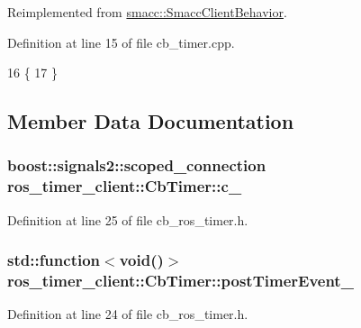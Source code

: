 Reimplemented from \hyperlink{classsmacc_1_1SmaccClientBehavior_ac0cd72d42bd00425362a97c9803ecce5}{smacc\+::\+Smacc\+Client\+Behavior}.



Definition at line 15 of file cb\+\_\+timer.\+cpp.


\begin{DoxyCode}
16 \{
17 \}
\end{DoxyCode}


\subsection{Member Data Documentation}
\subsubsection[{\texorpdfstring{c\+\_\+}{c_}}]{\setlength{\rightskip}{0pt plus 5cm}boost\+::signals2\+::scoped\+\_\+connection ros\+\_\+timer\+\_\+client\+::\+Cb\+Timer\+::c\+\_\+\hspace{0.3cm}{\ttfamily [private]}}\hypertarget{classros__timer__client_1_1CbTimer_a755a7f5d8662ae3b7507da0fe82e5b22}{}\label{classros__timer__client_1_1CbTimer_a755a7f5d8662ae3b7507da0fe82e5b22}


Definition at line 25 of file cb\+\_\+ros\+\_\+timer.\+h.

\subsubsection[{\texorpdfstring{post\+Timer\+Event\+\_\+}{postTimerEvent_}}]{\setlength{\rightskip}{0pt plus 5cm}std\+::function$<$void()$>$ ros\+\_\+timer\+\_\+client\+::\+Cb\+Timer\+::post\+Timer\+Event\+\_\+\hspace{0.3cm}{\ttfamily [private]}}\hypertarget{classros__timer__client_1_1CbTimer_a7e15bf1451d17c96aba814dc3e5c08e9}{}\label{classros__timer__client_1_1CbTimer_a7e15bf1451d17c96aba814dc3e5c08e9}


Definition at line 24 of file cb\+\_\+ros\+\_\+timer.\+h.



